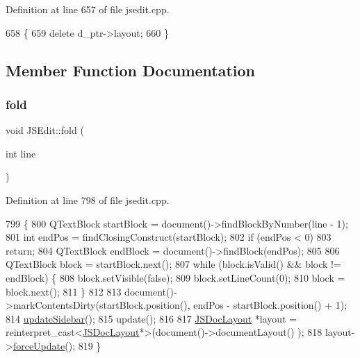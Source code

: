 Definition at line 657 of file jsedit.\+cpp.


\begin{DoxyCode}
658 \{
659     \textcolor{keyword}{delete} d\_ptr->layout;
660 \}
\end{DoxyCode}


\subsection{Member Function Documentation}
\mbox{\label{class_j_s_edit_a44ae8482351f716625bfbe42d0a1d5b3}} 
\subsubsection{\texorpdfstring{fold}{fold}}
{\footnotesize\ttfamily void J\+S\+Edit\+::fold (\begin{DoxyParamCaption}\item[{int}]{line }\end{DoxyParamCaption})\hspace{0.3cm}{\ttfamily [slot]}}



Definition at line 798 of file jsedit.\+cpp.


\begin{DoxyCode}
799 \{
800     QTextBlock startBlock = document()->findBlockByNumber(line - 1);
801     \textcolor{keywordtype}{int} endPos = findClosingConstruct(startBlock);
802     \textcolor{keywordflow}{if} (endPos < 0)
803         \textcolor{keywordflow}{return};
804     QTextBlock endBlock = document()->findBlock(endPos);
805 
806     QTextBlock block = startBlock.next();
807     \textcolor{keywordflow}{while} (block.isValid() && block != endBlock) \{
808         block.setVisible(\textcolor{keyword}{false});
809         block.setLineCount(0);
810         block = block.next();
811     \}
812 
813     document()->markContentsDirty(startBlock.position(), endPos - startBlock.position() + 1);
814     \hyperlink{class_j_s_edit_ac51a3a9f7b1e8c5bc98b345bfc3d3b53}{updateSidebar}();
815     update();
816 
817     \hyperlink{class_j_s_doc_layout}{JSDocLayout} *layout = \textcolor{keyword}{reinterpret\_cast<}\hyperlink{class_j_s_doc_layout}{JSDocLayout}*\textcolor{keyword}{>}(document()->documentLayout()
      );
818     layout->\hyperlink{class_j_s_doc_layout_a181d392df06a4e6fca1f38b3a5a86a2c}{forceUpdate}();
819 \}
\end{DoxyCode}
\mbox{\label{class_j_s_edit_a4a0ea37124129f1c18d84708c454834c}} 
